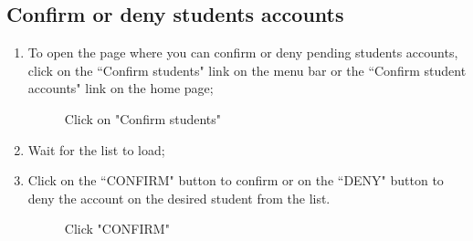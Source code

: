 \documentclass[ManualeUtente]{subfiles}
\begin{document}
	\subsection{Confirm or deny students accounts}
	\begin{enumerate}
		\item To open the page where you can confirm or deny pending students accounts, click on the \textquotedblleft Confirm students" link on the menu bar or the \textquotedblleft Confirm student accounts" link on the home page;
		\begin{figure}[H]
			\centering
			\caption{Click on "Confirm students"}
			\label{fig:Click on "Confirm students"}
		\end{figure}
		\item Wait for the list to load;
		\item Click on the \textquotedblleft CONFIRM" button to confirm or on the \textquotedblleft DENY" button to deny the account on the desired student from the list.
		\begin{figure}[H]
			\centering
			\caption{Click "CONFIRM"}
			\label{fig:Click "CONFIRM"}
		\end{figure}
	\end{enumerate}
	
\end{document}
